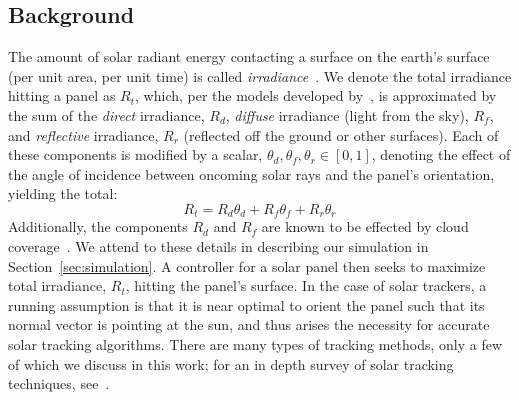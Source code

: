 \documentclass{article}
\begin{document}
\subsection{Background}

The amount of solar radiant energy contacting a surface on the earth's surface (per unit area, per unit time) is called {\it irradiance}~\cite{goswami2000principles}.  We denote the total irradiance hitting a panel as $R_t$, which, per the models developed by~\citet{kamali2006estimating}, is approximated by the sum of the {\it direct} irradiance, $R_d$, {\it diffuse} irradiance (light from the sky), $R_f$, and {\it reflective} irradiance, $R_r$ (reflected off the ground or other surfaces). Each of these components is modified by a scalar, $\theta_d, \theta_f, \theta_r \in [0,1]$, denoting the effect of the angle of incidence between oncoming solar rays and the panel's orientation, yielding the total:
\begin{equation}
R_t = R_d \theta_d + R_f \theta_f + R_r \theta_r
\label{eq:total_rads}
\end{equation}
Additionally, the components $R_d$ and $R_f$ are known to be effected by cloud coverage~\cite{li2004overcast,pfister2003cloud,tzoumanikas2016effect}. We attend to these details in describing our simulation in Section~\ref{sec:simulation}. A controller for a solar panel then seeks to maximize total irradiance, $R_t$, hitting the panel's surface. In the case of solar trackers, a running assumption is that it is near optimal to orient the panel such that its normal vector is pointing at the sun, and thus arises the necessity for accurate solar tracking algorithms. There are many types of tracking methods, only a few of which we discuss in this work; for an in depth survey of solar tracking techniques, see~\citet{mousazadeh2009review}.
\end{document}
